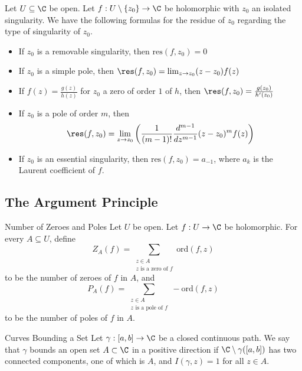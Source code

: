 \documentclass[a4paper]{article}
\begin{document}
\begin{prp}{}{} Let $U\subseteq\C$ be open. Let $f:U\setminus\{z_0\}\to\C$ be holomorphic with $z_0$ an isolated singularity. We have the following formulas for the residue of $z_0$ regarding the type of singularity of $z_0$. 
\begin{itemize}
\item If $z_0$ is a removable singularity, then $\text{res}(f,z_0)=0$
\item If $z_0$ is a simple pole, then $\res(f,z_0)=\lim_{z\to z_0}(z-z_0)f(z)$
\item If $f(z)=\frac{g(z)}{h(z)}$ for $z_0$ a zero of order $1$ of $h$, then $\res(f,z_0)=\frac{g(z_0)}{h'(z_0)}$
\item If $z_0$ is a pole of order $m$, then $$\res(f,z_0)=\lim_{z\to z_0}\left(\frac{1}{(m-1)!}\frac{d^{m-1}}{dz^{m-1}}(z-z_0)^mf(z)\right)$$
\item If $z_0$ is an essential singularity, then $\text{res}(f,z_0)=a_{-1}$, where $a_k$ is the Laurent coefficient of $f$. 
\end{itemize}
\end{prp}

\subsection{The Argument Principle}
\begin{defn}{Number of Zeroes and Poles}{} Let $U$ be open. Let $f:U\to\C$ be holomorphic. For every $A\subseteq U$, define $$Z_A(f)=\sum_{\substack{z\in A\\ z\text{ is a zero of }f}}\text{ord}(f,z)$$ to be the number of zeroes of $f$ in $A$, and $$P_A(f)=\sum_{\substack{z\in A\\ z\text{ is a pole of }f}}-\text{ord}(f,z)$$ to be the number of poles of $f$ in $A$. 
\end{defn}

\begin{defn}{Curves Bounding a Set}{} Let $\gamma:[a,b]\to\C$ be a closed continuous path. We say that $\gamma$ bounds an open set $A\subset\C$ in a positive direction if $\C\setminus\gamma([a,b])$ has two connected components, one of which is $A$, and $I(\gamma,z)=1$ for all $z\in A$. 
\end{defn}
\end{document}
